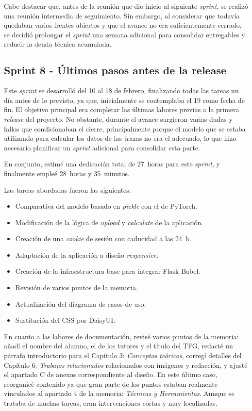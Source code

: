 Cabe destacar que, antes de la reunión que dio inicio al siguiente \textit{sprint}, se realizó una reunión intermedia de seguimiento. Sin embargo, al considerar que todavía quedaban varios frentes abiertos y que el avance no era suficientemente cerrado, se decidió prolongar el \textit{sprint} una semana adicional para consolidar entregables y reducir la deuda técnica acumulada.

\subsection{Sprint 8 - Últimos pasos antes de la release}
Este \textit{sprint} se desarrolló del 10 al 18 de febrero, finalizando todas las tareas un día antes de lo previsto, ya que, inicialmente se contemplaba el 19 como fecha de fin. El objetivo principal era completar las últimas labores previas a la primera \textit{release} del proyecto. No obstante, durante el avance surgieron varias dudas y fallos que condicionaban el cierre, principalmente porque el modelo que se estaba utilizando para calcular los datos de las trazas no era el adecuado, lo que hizo necesario planificar un \textit{sprint} adicional para consolidar esta parte.

En conjunto, estimé una dedicación total de 27~horas para este \textit{sprint}, y finalmente empleé 28~horas y 35~minutos.

Las tareas abordadas fueron las siguientes:
\begin{itemize}
	\item Comparativa del modelo basado en \textit{pickle} con el de PyTorch.
	\item Modificación de la lógica de \textit{upload} y \textit{calculate} de la aplicación.
	\item Creación de una \textit{cookie} de sesión con caducidad a las 24~h.
	\item Adaptación de la aplicación a diseño \textit{responsive}.
	\item Creación de la infraestructura base para integrar Flask-Babel.
	\item Revisión de varios puntos de la memoria.
	\item Actualización del diagrama de casos de uso.
	\item Sustitución del CSS por DaisyUI.
\end{itemize}

En cuanto a las labores de documentación, revisé varios puntos de la memoria: añadí el nombre del alumno, el de los tutores y el título del TFG, redacté un párrafo introductorio para el Capítulo 3: \textit{Conceptos teóricos}, corregí detalles del Capítulo 6: \textit{Trabajos relacionados} relacionados con imágenes y redacción, y ajusté el apartado C de anexos correspondiente al diseño. En este último caso, reorganicé contenido ya que gran parte de los puntos estaban realmente vinculados al apartado 4 de la memoria: \textit{Técnicas y Herramientas}. Aunque se trataba de muchas tareas, eran intervenciones cortas y muy localizadas.

